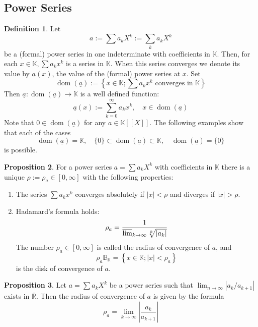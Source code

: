 \documentclass[12pt,a4paper]{book}
\newenvironment{enu}{\begin{enumerate}[(1)]}{\end{enumerate}}
\theoremstyle{definition}
\newtheorem{defn}{Definition}[section]
\newtheorem{prop}[defn]{Proposition}
\begin{document}
\subsection{Power Series}
\begin{defn}
    Let
    $$
    a:=\sum a_k X^k:=\sum_k a_k X^k
    $$
    be a (formal) power series in one indeterminate with coefficients in $\mathbb{K}$. Then, for each $x \in \mathbb{K}, \sum a_k x^k$ is a series in $\mathbb{K}$. When this series converges we denote its value by $\underline{a}(x)$, the value of the (formal) power series  at $x$. Set
    $$
    \operatorname{dom}(\underline{a}):=\left\{x \in \mathbb{K} ; \sum a_k x^k \text { converges in } \mathbb{K}\right\}
    $$
    Then $\underline{a}: \operatorname{dom}(\underline{a}) \rightarrow \mathbb{K}$ is a well defined function:
    $$
    \underline{a}(x):=\sum_{k=0}^{\infty} a_k x^k, \quad x \in \operatorname{dom}(\underline{a})
    $$
    Note that $0 \in \operatorname{dom}(\underline{a})$ for any $a \in \mathbb{K}[[X]]$. The following examples show that each of the cases
    $$
    \operatorname{dom}(\underline{a})=\mathbb{K}, \quad\{0\} \subset \operatorname{dom}(\underline{a}) \subset \mathbb{K}, \quad \operatorname{dom}(\underline{a})=\{0\}
    $$
    is possible.
\end{defn}
\begin{prop}
    For a power series $a=\sum a_k X^k$ with coefficients in $\mathbb{K}$ there is a unique $\rho:=\rho_a \in[0, \infty]$ with the following properties:
\begin{enu}
    \item The series $\sum a_k x^k$ converges absolutely if $|x|<\rho$ and diverges if $|x|>\rho$.
    \item Hadamard's formula holds:
    $$
    \rho_a=\frac{1}{\varlimsup_{k \rightarrow \infty} \sqrt[k]{\left|a_k\right|}}
    $$
    The number $\rho_a \in[0, \infty]$ is called the radius of convergence of $a$, and
    $$
    \rho_a \mathbb{B}_{\mathbb{K}}=\left\{x \in \mathbb{K} ;|x|<\rho_a\right\}
    $$
    is the disk of convergence of $a$.
\end{enu} 
\end{prop}
\begin{prop}
   Let $a=\sum a_k X^k$ be a power series such that $\lim_{n\to \infty} \left|a_k / a_{k+1}\right|$ exists in $\overline{\mathbb{R}}$. Then the radius of convergence of $a$ is given by the formula
    $$
    \rho_a=\lim _{k \rightarrow \infty}\left|\frac{a_k}{a_{k+1}}\right|
    $$
\end{prop}
\end{document}
